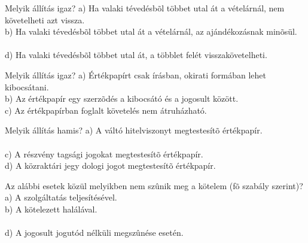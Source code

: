 \begin{frame}

\begin{tcolorbox}[title={137. Kérdés}]
Melyik állítás igaz?
\tcblower
a) Ha valaki tévedésbõl többet utal át a vételárnál, nem követelheti azt vissza.\\
b) Ha valaki tévedésbõl többet utal át a vételárnál, az ajándékozásnak minõsül.\\
\\
d) Ha valaki tévedésbõl többet utal át, a többlet felét visszakövetelheti.
\end{tcolorbox}

\begin{tcolorbox}[title={138. Kérdés}]
Melyik állítás igaz?
\tcblower
a) Értékpapírt csak írásban, okirati formában lehet kibocsátani.\\
b) Az értékpapír egy szerzõdés a kibocsátó és a jogosult között.\\
c) Az értékpapírban foglalt követelés nem átruházható.\\
\end{tcolorbox}

\begin{tcolorbox}[title={139. Kérdés}]
Melyik állítás hamis?
\tcblower
a) A váltó hitelviszonyt megtestesítõ értékpapír.\\
\\
c) A részvény tagsági jogokat megtestesítõ értékpapír.\\
d) A közraktári jegy dologi jogot megtestesítõ értékpapír.
\end{tcolorbox}

\begin{tcolorbox}[title={140. Kérdés}]
Az alábbi esetek közül melyikben nem szûnik meg a kötelem (fõ szabály szerint)?
\tcblower
a) A szolgáltatás teljesítésével.\\
b) A kötelezett halálával.\\
\\
d) A jogosult jogutód nélküli megszûnése esetén.
\end{tcolorbox}

\end{frame}


